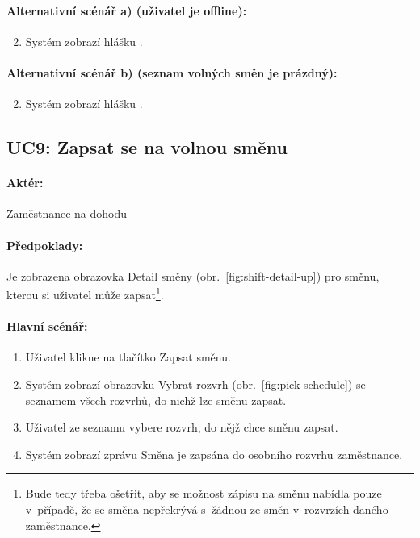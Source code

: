 \documentclass[twoside]{ctuthesis}
\begin{document}
\paragraph{Alternativní scénář a) (uživatel je offline):}
\begin{enumerate}[label=\arabic*a]
	\setcounter{enumi}{1}
	\item Systém zobrazí hlášku .
\end{enumerate}

\paragraph{Alternativní scénář b) (seznam volných směn je prázdný):}
\begin{enumerate}[label=\arabic*b]
	\setcounter{enumi}{1}
	\item Systém zobrazí hlášku .
\end{enumerate}


\newpage
\subsection{UC9: Zapsat se na volnou směnu}
\paragraph{Aktér:} Zaměstnanec na dohodu
\paragraph{Předpoklady:} Je zobrazena obrazovka Detail směny (obr.~\ref{fig:shift-detail-up}) pro směnu, kterou si uživatel může zapsat\footnote{Bude tedy třeba ošetřit, aby se možnost zápisu na směnu nabídla pouze v~případě, že se směna nepřekrývá s~žádnou ze směn v~rozvrzích daného zaměstnance.}.
\paragraph{Hlavní scénář:}
\begin{enumerate}
	\item Uživatel klikne na tlačítko Zapsat směnu.
	\item Systém zobrazí obrazovku Vybrat rozvrh (obr.~\ref{fig:pick-schedule}) se seznamem všech rozvrhů, do nichž lze směnu zapsat.
	\item Uživatel ze seznamu vybere rozvrh, do nějž chce směnu zapsat.
	\item Systém zobrazí zprávu  Směna je zapsána do osobního rozvrhu zaměstnance.
\end{enumerate}
\end{document}
